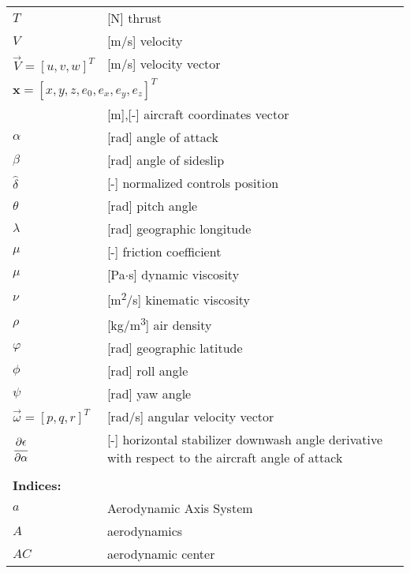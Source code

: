 \begin{longtable}[l]{ l p{} }
  $T$                                          & [N] thrust \\
  $V$                                          & [m/s] velocity \\
  $\vec V=\left[ u, v, w \right]^T$            & [m/s] velocity vector \\
  \multicolumn{2}{l}{$\boldsymbol x=\left[ x,y,z,e_0,e_x,e_y,e_z \right]^T$} \\
                                               & [m],[-] aircraft coordinates vector \\
  $\alpha$                                     & [rad] angle of attack \\
  $\beta$                                      & [rad] angle of sideslip \\
  $\hat \delta$                                & [-] normalized controls position \\
  $\theta$                                     & [rad] pitch angle \\
  $\lambda$                                    & [rad] geographic longitude \\
  $\mu$                                        & [-] friction coefficient \\
  $\mu$                                        & [Pa$\cdot$s] dynamic viscosity \\
  $\nu$                                        & [m\textsuperscript{2}/s] kinematic viscosity \\
  $\rho$                                       & [kg/m\textsuperscript{3}] air density \\
  $\varphi$                                    & [rad] geographic latitude \\
  $\phi$                                       & [rad] roll angle \\
  $\psi$                                       & [rad] yaw angle \\
  $\vec \omega=\left[ p, q, r \right]^T$       & [rad/s] angular velocity vector \\
  $\cfrac{\partial \epsilon}{\partial \alpha}$ & [-] horizontal stabilizer downwash angle derivative with respect to the aircraft angle of attack \\
  & \\
  \multicolumn{2}{l}{\textbf{Indices:}} \\
  $a$   & Aerodynamic Axis System \\
  $A$   & aerodynamics \\
  $AC$  & aerodynamic center \\

\end{longtable}
